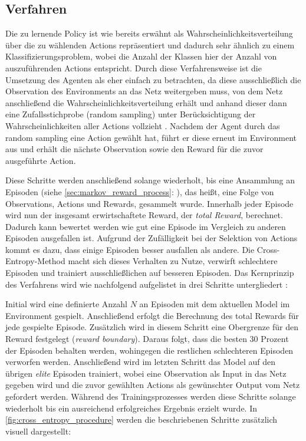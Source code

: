 \documentclass[11pt]{scrartcl}
\begin{document}
\subsection{Verfahren}
Die zu lernende Policy ist wie bereits erwähnt als Wahrscheinlichkeitsverteilung über die 
zu wählenden Actions repräsentiert und dadurch sehr ähnlich zu einem Klassifizierungsproblem,
wobei die Anzahl der Klassen hier der Anzahl von auszuführenden Actions entspricht. Durch
diese Verfahrensweise ist die Umsetzung des Agenten als eher einfach zu betrachten, da
diese ausschließlich die Observation des Environments an das Netz weitergeben muss, von
dem Netz anschließend die Wahrscheinlichkeitsverteilung erhält und anhand dieser dann eine
Zufallsstichprobe (random sampling) unter Berücksichtigung der Wahrscheinlichkeiten aller
Actions vollzieht \cite[~S.78]{L2018}. Nachdem der Agent durch das random sampling eine
Action gewählt hat, führt er diese erneut im Environment aus und erhält die nächste
Observation sowie den Reward für die zuvor ausgeführte Action.

Diese Schritte werden anschließend solange wiederholt, bis eine Ansammlung an Episoden (siehe 
\autoref{sec:markov_reward_process}: ), das heißt, eine Folge
von Observations, Actions und Rewards, gesammelt wurde. Innerhalb jeder Episode wird nun der
insgesamt erwirtschaftete Reward, der \textit{total Reward}, berechnet. Dadurch kann bewertet werden
wie gut eine Episode im Vergleich zu anderen Episoden ausgefallen ist. Aufgrund der Zufälligkeit
bei der Selektion von Actions kommt es dazu, dass einige Episoden besser ausfallen als andere.
Die Cross-Entropy-Method macht sich dieses Verhalten zu Nutze, verwirft schlechtere Episoden und
trainiert ausschließlichen auf besseren Episoden. Das Kernprinzip des Verfahrens wird wie nachfolgend
aufgelistet in drei Schritte untergliedert \cite[~S.80 f.]{L2018}:

Initial wird eine definierte Anzahl $N$ an Episoden mit dem aktuellen Model im Environment gespielt. Anschließend erfolgt die Berechnung des total Rewards für jede gespielte Episode. Zusätzlich wird in 
diesem Schritt eine Obergrenze für den Reward festgelegt 
(\textit{reward boundary}). Daraus folgt, dass die besten 30 Prozent der Episoden behalten werden,
wohingegen die restlichen schlechteren Episoden verworfen werden. Anschließend wird im letzten Schritt
das Model auf den übrigen \textit{elite} Episoden trainiert, wobei eine Observation als Input in das
Netz gegeben wird und die zuvor gewählten Actions als gewünschter Output vom Netz gefordert werden.
Während des Trainingsprozesses werden diese Schritte solange wiederholt bis ein ausreichend
erfolgreiches Ergebnis erzielt wurde. In \autoref{fig:cross_entropy_procedure} werden die
beschriebenen Schritte zusätzlich visuell dargestellt:
\end{document}
